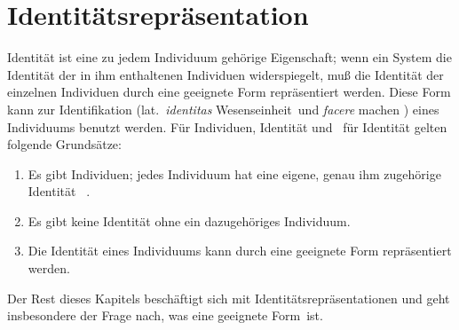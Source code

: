 \section{Identit\"{a}tsrepr\"{a}sentation}\label{sec:idrepr}
%
Identit\"{a}t ist eine zu jedem Individuum geh\"{o}rige Eigenschaft; wenn
ein System die Identit\"{a}t der in ihm enthaltenen Individuen
widerspiegelt, mu\ss{} die Identit\"{a}t der einzelnen Individuen durch eine
geeignete Form repr\"{a}sentiert werden. Diese Form kann zur
Identifikation (lat.\ {\em identitas\/} \rglq{}Wesenseinheit\rgrq\ und
{\em facere\/} \rglq{}machen\rgrq{} \cite{bib:wa68}) eines Individuums
benutzt werden. F\"{u}r Individuen, Identit\"{a}t und
\representationforms\ f\"{u}r Identit\"{a}t gelten folgende
Grunds\"{a}tze:
%
\begin{enumerate}
%
\item Es gibt Individuen; jedes Individuum hat eine eigene, genau ihm
zu\-ge\-h\"{o}\-ri\-ge Iden\-ti\-t\"{a}t\ %
\linebreak[4]\cite[]{bib:pat88}.
%
\item Es gibt keine Identit\"{a}t ohne ein dazugeh\"{o}riges Individuum.
%
\item Die Identit\"{a}t eines Individuums kann durch eine geeignete Form
repr\"{a}sentiert werden.
%
\end{enumerate}
%
Der Rest dieses Kapitels besch\"{a}ftigt sich mit
Identit\"{a}tsrepr\"{a}sentationen und geht insbesondere der Frage nach, was
eine \rglq{}geeignete Form\rgrq\ ist.
%
